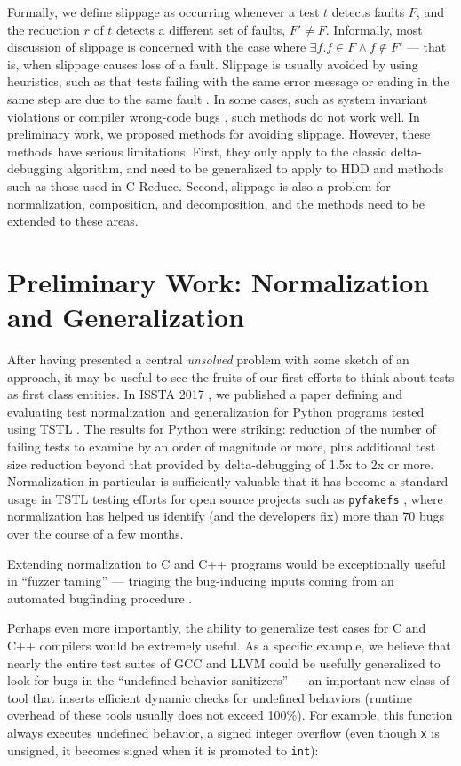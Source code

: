 {Formally, we define slippage as occurring whenever a test $t$ detects
faults $F$, and the reduction $r$ of $t$ detects a different set of
faults, $F' \neq F$.  Informally, most discussion of slippage is
concerned with the case where
$\exists f .  f \in F \wedge f \not\in F'$ --- that is, when slippage
causes loss of a fault.  Slippage is usually avoided by using
heuristics, such as that tests failing with the same error message or
ending in the same step are due to the same fault \cite{ICSEDiff}.  In
some cases, such as system invariant violations or compiler wrong-code
bugs \cite{PLDI13}, such methods do not work well.  In preliminary
work, we proposed methods \cite{slippageFSE} for avoiding slippage.
However, these methods have serious limitations.  First, they only
apply to the classic delta-debugging algorithm, and need to be
generalized to apply to HDD and methods such as those used in
C-Reduce.  Second, slippage is also a problem for normalization,
composition, and decomposition, and the methods need to be extended to
these areas.  


}

\section{Preliminary Work: Normalization and Generalization}

After having presented a central \emph{unsolved} problem with some
sketch of an approach, it may be useful to see the fruits of our first
efforts to think about tests as first class entities.  In ISSTA 2017
\cite{OneTest}, we published a paper defining and evaluating test
normalization and generalization for Python programs tested using TSTL
\cite{OneTest}.  The results for Python were striking:  reduction of
the number of failing tests to examine by an order of magnitude or
more, plus additional test size reduction beyond that provided by
delta-debugging of 1.5x to 2x or more.  Normalization in particular is
sufficiently valuable that it has become a standard usage in TSTL
testing efforts for open source projects such as {\tt pyfakefs}
\cite{pyfakefs}, where normalization has helped us identify (and the
developers fix) more than 70 bugs over the course of a few months.


Extending normalization to C and C++ programs would be exceptionally useful in
``fuzzer taming'' --- triaging the bug-inducing inputs coming
from an automated bugfinding procedure \cite{PLDI13}.

Perhaps even more importantly, the ability to generalize test cases for C and C++ compilers
would be extremely useful.
As a specific example, we believe that nearly the entire test suites
of GCC and LLVM could be usefully generalized to look for bugs in the
``undefined behavior sanitizers'' --- an important new class of tool
that inserts efficient dynamic checks for undefined behaviors (runtime
overhead of these tools usually does not exceed 100\%).
%
For example, this function always executes undefined behavior, a signed
integer overflow (even though \texttt{x} is unsigned, it becomes signed
when it is promoted to \texttt{int}):

